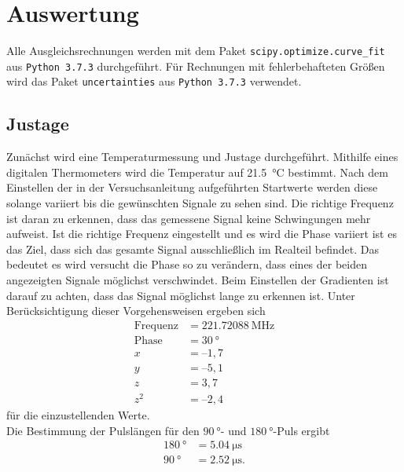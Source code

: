 \section{Auswertung}

Alle Ausgleichsrechnungen werden mit dem Paket \texttt{scipy.optimize.curve\_fit}  aus \texttt{Python 3.7.3} durchgeführt.
Für Rechnungen mit fehlerbehafteten Größen wird das Paket \texttt{uncertainties} aus \texttt{Python 3.7.3} verwendet.\\

\subsection{Justage}
Zunächst wird eine Temperaturmessung und Justage durchgeführt. Mithilfe eines digitalen Thermometers wird die Temperatur 
auf \SI{21.5}{\degreeCelsius} bestimmt. Nach dem Einstellen der in der Versuchsanleitung \cite{anleitung} aufgeführten Startwerte
werden diese solange variiert bis die gewünschten Signale zu sehen sind.
Die richtige Frequenz ist daran zu erkennen, dass das gemessene Signal keine Schwingungen mehr aufweist. Ist die richtige Frequenz
eingestellt und es wird die Phase variiert ist es das Ziel, dass sich das gesamte Signal ausschließlich im Realteil befindet.
Das bedeutet es wird versucht die Phase so zu verändern, dass eines der beiden angezeigten Signale möglichst verschwindet.
Beim Einstellen der Gradienten ist darauf zu achten, dass das Signal möglichst lange zu erkennen ist. 
Unter Berücksichtigung dieser Vorgehensweisen ergeben sich
\begin{align}
  \text{Frequenz}&=\SI{221.72088}{\mega\hertz} \\
  \text{Phase} &= \SI{30}{\degree} \\
    x&=–1,7 \\
    y&=–5,1 \\
    z&=3,7 \\
    z^2 &=–2,4
\end{align} \noindent
für die einzustellenden Werte. \\
Die Bestimmung der Pulslängen für den $\SI{90}{\degree}$- und $\SI{180}{\degree}$-Puls ergibt
\begin{align}
  \SI{180}{\degree} &= \SI{5.04}{\micro\second}\\
  \SI{90}{\degree}  &= \SI{2.52}{\micro\second}.
\end{align} \noindent

